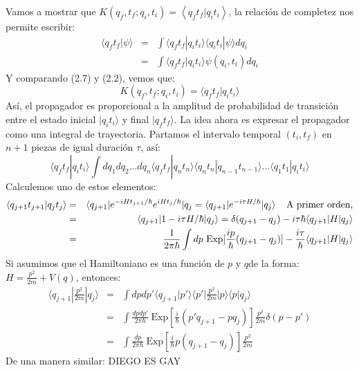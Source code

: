 Vamos a mostrar que $K(q_f,t_f;q_i,t_i)=\left\langle q_ft_f|q_it_i \right\rangle$, la relación de completez nos permite escribir:
\begin{eqnarray}
\nonumber \langle q_ft_f|\psi\rangle &=& \int\langle q_ft_f|q_it_i\rangle\langle q_it_i|\psi\rangle dq_i\\
&=& \int \langle q_ft_f|q_it_i\rangle \psi(q_i,t_i)dq_i
\end{eqnarray}
Y comparando (2.7) y (2.2), vemos que:
\begin{equation}
K(q_f,t_f;q_i,t_i)=\langle q_ft_f|q_it_i\rangle
\end{equation}
Así, el propagador es proporcional a la amplitud de probabilidad de transición entre el estado inicial $|q_it_i\rangle$ y final $|q_ft_f\rangle$. La idea ahora es expresar el propagador como una integral de trayectoria. Partamos el intervalo temporal $(t_i,t_f)$ en $n+1$ piezas de igual duración $\tau$, así:
\begin{equation}
\langle q_ft_f|q_it_i\rangle \int dq_1dq_2...dq_n\langle q_ft_f|q_nt_n\rangle \langle q_nt_n|q_{n-1}t_{n-1}\rangle...\langle q_1t_1|q_it_i\rangle
\end{equation}
Calculemos uno de estos elementos:
\begin{eqnarray}
\nonumber \langle q_{j+1}t_{j+1}|q_jt_j\rangle &=&\langle q_{j+1}|e^{-iHt_{j+1}/\hbar}e^{iHt_j/\hbar}|q_j=\langle q_{j+1}|e^{-i\tau H/\hbar}|q_j\rangle \hspace{0.4cm}\text{A primer orden,}\\
\nonumber &=&\langle q_{j+1}|1-i\tau H/\hbar|q_j\rangle=\delta(q_{j+1}-q_j)-i\tau\hbar\langle q_{j+1}|H|q_j\rangle\\
&=& \frac{1}{2\pi\hbar}\int dp\ \text{Exp}[\frac{ip}{\hbar}(q_{j+1}-q_j)]-\frac{i\tau}{\hbar}\langle q_{j+1}|H|q_j\rangle 
\end{eqnarray}	
Si asumimos que el Hamiltoniano es una función de $p$ y $q$de la forma: $H=\frac{p^2}{2m}+V(q)$, entonces:
\begin{eqnarray}
\nonumber \langle q_{j+1}|\frac{p^2}{2m}|q_j \rangle &=& \int dpdp\prime \langle q_{j+1}|p\prime\rangle\langle p\prime|\frac{p^2}{2m}|p\rangle \langle p|q_j \rangle\\
\nonumber &=&\int \frac{dpdp\prime}{2\pi\hbar}\ \text{Exp}[\frac{i}{\hbar}(p\prime q_{j+1}-pq_j)]\frac{p^2}{2m}\delta(p-p\prime)\\
&=& \int \frac{dp}{2\pi\hbar}\ \text{Exp}[\frac{i}{\hbar}p(q_{j+1}-q_j)]\frac{p^2}{2m}
\end{eqnarray}
De una manera similar:
DIEGO ES GAY


